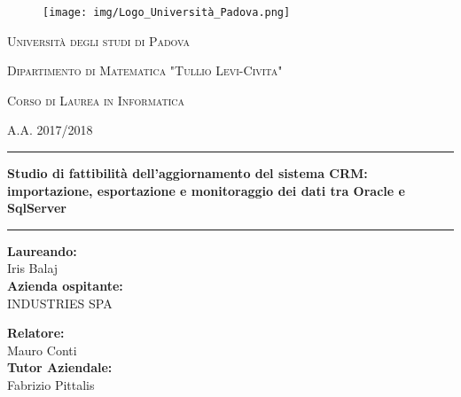 \begin{figure}[!h]
\thispagestyle{empty}
\centering
\texttt{[image: img/Logo\_Università\_Padova.png]}
\end{figure}
\vspace{8mm}

\centerline{\LARGE \textsc{Università degli studi di Padova}}
\vspace{2mm}
\centerline{\large \textsc{Dipartimento di Matematica "Tullio Levi-Civita"}}

\vspace{10mm}
\centerline{\normalsize \textsc{Corso di Laurea in Informatica}}
\centerline{\normalsize \textsc{A.A. 2017/2018}}

\vspace{8mm}
\par\noindent\rule{150mm}{2pt}

\begin{center}
\Large \textbf{Studio di fattibilità dell'aggiornamento del sistema CRM: importazione, esportazione e monitoraggio dei dati tra Oracle e SqlServer}
\end{center}

\par\noindent\rule{150mm}{2pt}

\vspace{7mm}
\begin{minipage}{2in}
\textbf{Laureando:} \\
Iris Balaj \\
\newline
\textbf{Azienda ospitante:} \\
INDUSTRIES SPA
\end{minipage}
\hfill
\begin{minipage}{2in}
\textbf{Relatore:} \\
Mauro Conti \\
\newline
\textbf{Tutor Aziendale:} \\
Fabrizio Pittalis
\end{minipage}